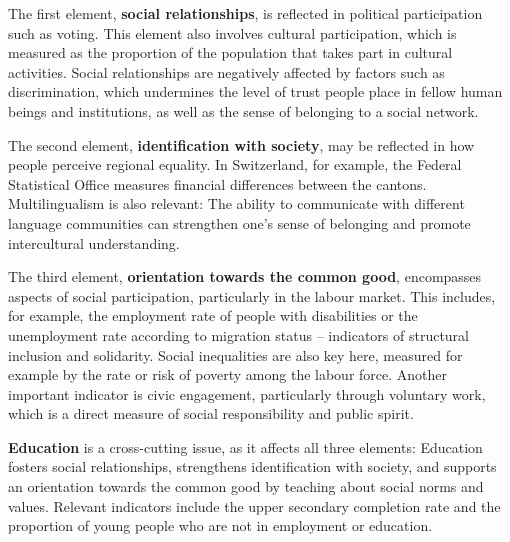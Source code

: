 \documentclass[
  a4paper,
  openany]{book}
\begin{document}
The first element, \textbf{social relationships}, is reflected in
political participation such as voting. This element also involves
cultural participation, which is measured as the proportion of the
population that takes part in cultural activities. Social relationships
are negatively affected by factors such as discrimination, which
undermines the level of trust people place in fellow human beings and
institutions, as well as the sense of belonging to a social network.

The second element, \textbf{identification with society}, may be
reflected in how people perceive regional equality. In Switzerland, for
example, the Federal Statistical Office measures financial differences
between the cantons. Multilingualism is also relevant: The ability to
communicate with different language communities can strengthen one's
sense of belonging and promote intercultural understanding.

The third element, \textbf{orientation towards the common good},
encompasses aspects of social participation, particularly in the labour
market. This includes, for example, the employment rate of people with
disabilities or the unemployment rate according to migration status --
indicators of structural inclusion and solidarity. Social inequalities
are also key here, measured for example by the rate or risk of poverty
among the labour force. Another important indicator is civic engagement,
particularly through voluntary work, which is a direct measure of social
responsibility and public spirit.

\textbf{Education} is a cross-cutting issue, as it affects all three
elements: Education fosters social relationships, strengthens
identification with society, and supports an orientation towards the
common good by teaching about social norms and values. Relevant
indicators include the upper secondary completion rate and the
proportion of young people who are not in employment or education.
\end{document}
